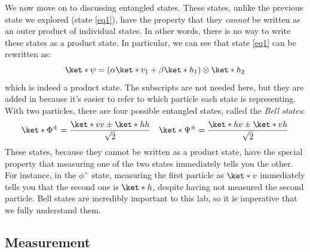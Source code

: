 \documentclass[10pt]{article}
\begin{document}
	We now move on to discussing entangled states. These states, unlike the previous state we explored (state
	\ref{eq1}), have the property that they \textit{cannot} be written as an outer product of individual
	states. In other words, there is no way to write these states as a product state. In particular, we can
	see that state \ref{eq1} can be rewritten as:
	\[
		\ket*{\psi} = (\alpha \ket*{v}_1 + \beta\ket*{h}_1) \otimes \ket*{h}_2
	\]
	which is indeed a product state. The subscripts are not needed here, but they are added in because it's
	easier to refer to which particle each state is representing. With two particles, there are four possible
	entangled states, called the \textit{Bell states}:
	\begin{equation}
		\label{bell-states}
		\ket*{\Phi^{\pm}} = \frac{\ket*{vv} \pm \ket*{hh}}{\sqrt{2}} \quad \ket*{\Psi^{\pm}} =
		\frac{\ket*{hv} \pm \ket*{vh}}{\sqrt{2}}
	\end{equation}
	These states, because they cannot be written as a product state, have the special property that measuring
	one of the two states immediately tells you the other. For instance, in the \( \phi^{+} \) state,
	measuring the first particle as \( \ket*{v} \) immediately tells you that the second one is \( \ket*{h} \),
	despite having not measured the second particle. Bell states are incredibly important to this lab, so it
	is imperative that we fully understand them. 

	\subsection{Measurement}
\end{document}
